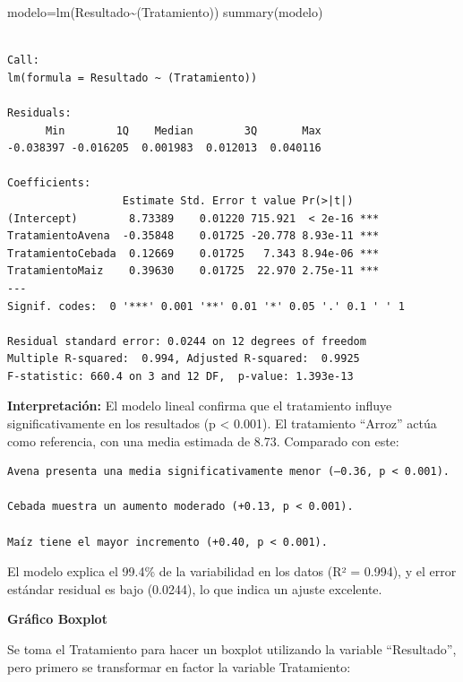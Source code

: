 \documentclass[
  spanish,
  letterpaper,
  DIV=11,
  numbers=noendperiod]{scrreprt}
\newenvironment{Shaded}{\begin{snugshade}}{\end{snugshade}}
\newcommand{\FunctionTok}[1]{\textcolor[rgb]{0.28,0.35,0.67}{#1}}
\newcommand{\NormalTok}[1]{\textcolor[rgb]{0.00,0.23,0.31}{#1}}
\newcommand{\OtherTok}[1]{\textcolor[rgb]{0.00,0.23,0.31}{#1}}
\newcommand{\SpecialCharTok}[1]{\textcolor[rgb]{0.37,0.37,0.37}{#1}}
\begin{document}
\begin{Shaded}
\begin{Highlighting}[]
\NormalTok{modelo}\OtherTok{=}\FunctionTok{lm}\NormalTok{(Resultado}\SpecialCharTok{\textasciitilde{}}\NormalTok{(Tratamiento))}
\FunctionTok{summary}\NormalTok{(modelo)}
\end{Highlighting}
\end{Shaded}

\begin{verbatim}

Call:
lm(formula = Resultado ~ (Tratamiento))

Residuals:
      Min        1Q    Median        3Q       Max 
-0.038397 -0.016205  0.001983  0.012013  0.040116 

Coefficients:
                  Estimate Std. Error t value Pr(>|t|)    
(Intercept)        8.73389    0.01220 715.921  < 2e-16 ***
TratamientoAvena  -0.35848    0.01725 -20.778 8.93e-11 ***
TratamientoCebada  0.12669    0.01725   7.343 8.94e-06 ***
TratamientoMaiz    0.39630    0.01725  22.970 2.75e-11 ***
---
Signif. codes:  0 '***' 0.001 '**' 0.01 '*' 0.05 '.' 0.1 ' ' 1

Residual standard error: 0.0244 on 12 degrees of freedom
Multiple R-squared:  0.994, Adjusted R-squared:  0.9925 
F-statistic: 660.4 on 3 and 12 DF,  p-value: 1.393e-13
\end{verbatim}

\textbf{Interpretación:} El modelo lineal confirma que el tratamiento
influye significativamente en los resultados (p \textless{} 0.001). El
tratamiento ``Arroz'' actúa como referencia, con una media estimada de
8.73. Comparado con este:

\begin{verbatim}
Avena presenta una media significativamente menor (–0.36, p < 0.001).

Cebada muestra un aumento moderado (+0.13, p < 0.001).

Maíz tiene el mayor incremento (+0.40, p < 0.001).
\end{verbatim}

El modelo explica el 99.4\% de la variabilidad en los datos (R² =
0.994), y el error estándar residual es bajo (0.0244), lo que indica un
ajuste excelente.

\textbf{Gráfico Boxplot}

Se toma el Tratamiento para hacer un boxplot utilizando la variable
``Resultado'', pero primero se transformar en factor la variable
Tratamiento:
\end{document}

